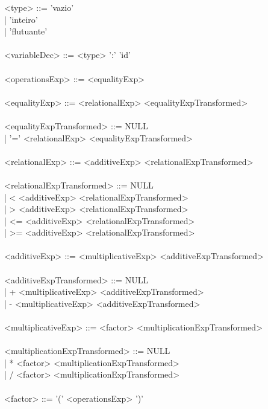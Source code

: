\documentclass[12pt,a4paper,final]{article}
\newcommand\tab[1][1cm]{\hspace*{#1}}
\begin{document}
<type> ::= 'vazio'\\
\tab\tab | 'inteiro'\\
\tab\tab | 'flutuante'\\
\\
<variableDec> ::= <type> ':' 'id' \\
\\
<operationsExp> ::= <equalityExp>\\
\\
<equalityExp> ::= <relationalExp> <equalityExpTransformed>\\
\\
<equalityExpTransformed> ::= NULL\\
\tab\tab\tab\tab\tab | '=' <relationalExp> <equalityExpTransformed>\\
\\
<relationalExp> ::= <additiveExp> <relationalExpTransformed>\\
\\
<relationalExpTransformed> ::= NULL\\
\tab \tab \tab \tab \tab| < <additiveExp> <relationalExpTransformed>\\
\tab \tab \tab \tab \tab| > <additiveExp> <relationalExpTransformed>\\
\tab \tab \tab \tab \tab| <= <additiveExp> <relationalExpTransformed>\\
\tab \tab \tab \tab \tab| >= <additiveExp> <relationalExpTransformed>\\
\\
<additiveExp> ::= <multiplicativeExp> <additiveExpTransformed>\\
\\
<additiveExpTransformed> ::= NULL\\
\tab \tab \tab \tab \tab| + <multiplicativeExp> <additiveExpTransformed>\\
\tab \tab \tab \tab \tab| - <multiplicativeExp> <additiveExpTransformed> \\		
\\
<multiplicativeExp> ::= <factor> <multiplicationExpTransformed>\\
\\
<multiplicationExpTransformed> ::= NULL\\
\tab \tab \tab \tab \tab \tab| * <factor> <multiplicationExpTransformed>\\
\tab \tab \tab \tab \tab \tab| / <factor> <multiplicationExpTransformed>\\
\\
<factor> ::= '(' <operationsExp> ')'\\
\end{document}
